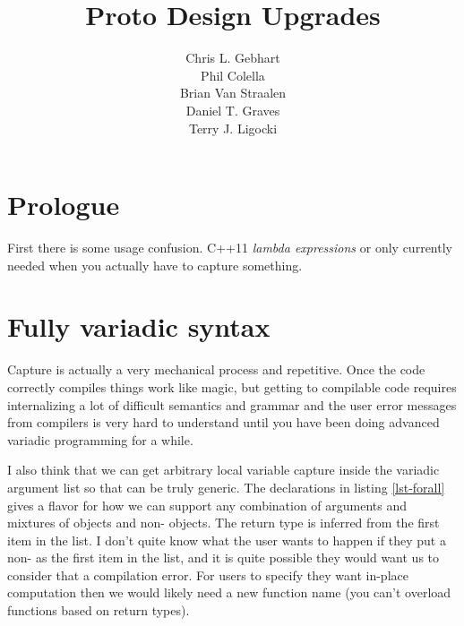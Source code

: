 \documentclass[12pt,a4paper]{article}
\title{Proto Design Upgrades}
\author{Chris L. Gebhart\\Phil Colella \\ Brian Van Straalen\\
  Daniel T. Graves\\Terry J. Ligocki}
\begin{document}
\lstset{language=C++,style=protostyle}
\maketitle

\section{Prologue}
First there is some usage confusion.  C++11 {\em lambda expressions} or only currently needed when you actually have to capture something.

\section{Fully variadic  syntax}

Capture is actually a very mechanical process and repetitive.  Once the code correctly compiles things work like magic, but getting to compilable code requires internalizing a lot of difficult semantics and grammar and the user error messages from compilers is very hard to understand until you have been doing advanced variadic programming for a while.

I also think that we can get arbitrary local variable capture inside the variadic argument list so that  can be truly generic.  The declarations in listing \ref{lst-forall} gives a flavor for how we can support any combination of arguments and mixtures of  objects and non- objects.  The return type is inferred from the first item in the list.  I don't quite know what the user wants to happen if they put a non- as the first item in the list, and it is quite possible they would want us to consider that a compilation error. For users to specify they want in-place computation then we would likely need a new function name (you can't overload functions based on return types).
\end{document}

